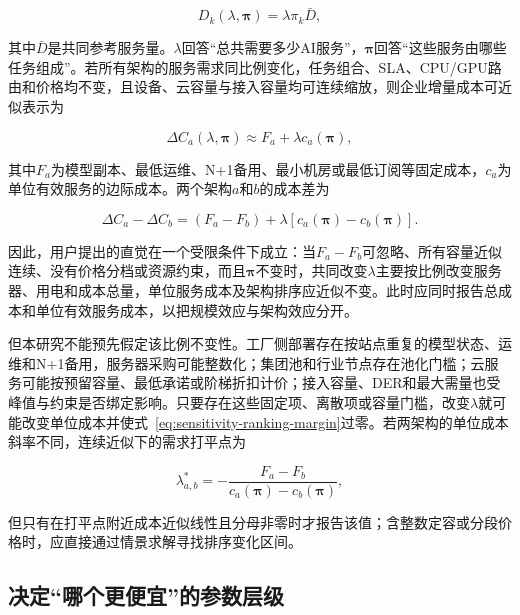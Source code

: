\documentclass[preprint]{elsarticle}
\begin{document}
\begin{equation}
 D_k(\lambda,\bm\pi)=\lambda\pi_k\bar D,
 \label{eq:sensitivity-demand-decomposition}
\end{equation}

其中$\bar D$是共同参考服务量。$\lambda$回答“总共需要多少AI服务”，$\bm\pi$回答“这些服务由哪些任务组成”。若所有架构的服务需求同比例变化，任务组合、SLA、CPU/GPU路由和价格均不变，且设备、云容量与接入容量均可连续缩放，则企业增量成本可近似表示为

\begin{equation}
 \Delta C_a(\lambda,\bm\pi)
 \approx F_a+\lambda c_a(\bm\pi),
 \label{eq:sensitivity-cost-scale}
\end{equation}

其中$F_a$为模型副本、最低运维、N+1备用、最小机房或最低订阅等固定成本，$c_a$为单位有效服务的边际成本。两个架构$a$和$b$的成本差为

\begin{equation}
 \Delta C_a-\Delta C_b
 =(F_a-F_b)+\lambda\left[c_a(\bm\pi)-c_b(\bm\pi)\right].
 \label{eq:sensitivity-ranking-margin}
\end{equation}

因此，用户提出的直觉在一个受限条件下成立：当$F_a-F_b$可忽略、所有容量近似连续、没有价格分档或资源约束，而且$\bm\pi$不变时，共同改变$\lambda$主要按比例改变服务器、用电和成本总量，单位服务成本及架构排序应近似不变。此时应同时报告总成本和单位有效服务成本，以把规模效应与架构效应分开。

但本研究不能预先假定该比例不变性。工厂侧部署存在按站点重复的模型状态、运维和N+1备用，服务器采购可能整数化；集团池和行业节点存在池化门槛；云服务可能按预留容量、最低承诺或阶梯折扣计价；接入容量、DER和最大需量也受峰值与约束是否绑定影响。只要存在这些固定项、离散项或容量门槛，改变$\lambda$就可能改变单位成本并使式~\eqref{eq:sensitivity-ranking-margin}过零。若两架构的单位成本斜率不同，连续近似下的需求打平点为

\begin{equation}
 \lambda^*_{a,b}
 =-\frac{F_a-F_b}{c_a(\bm\pi)-c_b(\bm\pi)},
 \label{eq:sensitivity-demand-break-even}
\end{equation}

但只有在打平点附近成本近似线性且分母非零时才报告该值；含整数定容或分段价格时，应直接通过情景求解寻找排序变化区间。

\subsection{决定“哪个更便宜”的参数层级}
\end{document}
